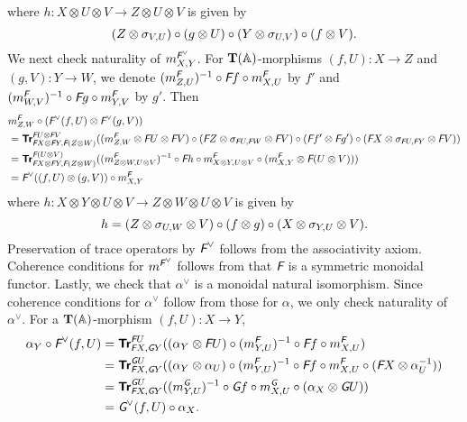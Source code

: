 where $h \colon X \otimes U \otimes V \to Z \otimes U \otimes V$ is given by
\begin{equation*}
  (Z \otimes \sigma_{V,U}) \circ (g \otimes U) \circ (Y \otimes \sigma_{U,V})
  \circ (f \otimes V).
\end{equation*}
We next check naturality of $m^{\textit{\textsf{F}}^{\vee}}_{X,Y}$. For
$\mathbf T(\mathbb{A})$-morphisms $(f,U) \colon X \to Z$ and $(g,V) \colon Y
\to W$, we denote $(m^{\textit{\textsf{F}}}_{Z,U})^{-1} \circ \textit{\textsf{F}}f \circ m^{\textit{\textsf{F}}}_{X,U}$ by
$f'$ and $(m_{W,V}^{\textit{\textsf{F}}})^{-1} \circ \textit{\textsf{F}}g \circ m^{\textit{\textsf{F}}}_{Y,V}$ by $g'$. Then
\begin{align*}
  & m^{\textit{\textsf{F}}}_{Z,W} \circ (\textit{\textsf{F}}^{\vee}(f,U) \otimes \textit{\textsf{F}}^{\vee}(g,V)) \\
  &= {\normalfont\textsf{\textbf{Tr}}}^{\textit{\textsf{F}}U \otimes \textit{\textsf{F}}V}_{\textit{\textsf{F}}X \otimes \textit{\textsf{F}}Y,\textit{\textsf{F}}(Z \otimes W)}
  ((m^{\textit{\textsf{F}}}_{Z,W} \otimes \textit{\textsf{F}}U \otimes \textit{\textsf{F}}V) \circ
  (\textit{\textsf{F}}Z \otimes \sigma_{\textit{\textsf{F}}U,\textit{\textsf{F}}W} \otimes \textit{\textsf{F}}V) \circ
  (\textit{\textsf{F}}f' \otimes \textit{\textsf{F}}g') \circ
  (\textit{\textsf{F}}X \otimes \sigma_{\textit{\textsf{F}}U,\textit{\textsf{F}}Y} \otimes \textit{\textsf{F}}V)) \\
  &= {\normalfont\textsf{\textbf{Tr}}}^{\textit{\textsf{F}}(U \otimes V)}_{\textit{\textsf{F}}X \otimes \textit{\textsf{F}}Y,\textit{\textsf{F}}(Z \otimes W)}
  ((m_{Z \otimes W, U \otimes V}^{\textit{\textsf{F}}})^{-1} \circ
  \textit{\textsf{F}}h \circ
  m_{X \otimes Y, U \otimes V}^{\textit{\textsf{F}}} \circ
  (m_{X,Y}^{\textit{\textsf{F}}} \otimes \textit{\textsf{F}}(U \otimes V))) \\
  &= \textit{\textsf{F}}^{\vee}((f,U) \otimes (g,V)) \circ m^{\textit{\textsf{F}}}_{X,Y}
\end{align*}
where $h \colon X \otimes Y \otimes U \otimes V \to Z \otimes W \otimes U \otimes V$
is given by
\begin{equation*}
  h = (Z \otimes \sigma_{U,W} \otimes V) \circ (f \otimes g) \circ
  (X \otimes \sigma_{Y,U} \otimes V).
\end{equation*}
Preservation of trace operators by $\textit{\textsf{F}}^{\vee}$ follows from
the associativity axiom. Coherence conditions for
$m^{\textit{\textsf{F}}^{\vee}}$ follows from that $\textit{\textsf{F}}$ is a symmetric
monoidal functor. Lastly, we check that $\alpha^{\vee}$ is a
monoidal natural isomorphism. Since coherence conditions for
$\alpha^{\vee}$ follow from those for $\alpha$, we only check
naturality of $\alpha^{\vee}$. For a $\mathbf T(\mathbb{A})$-morphism $(f,U)
\colon X \to Y$,
\begin{align*}
  \alpha_{Y} \circ \textit{\textsf{F}}^{\vee}(f,U)
  &= {\normalfont\textsf{\textbf{Tr}}}^{\textit{\textsf{F}}U}_{\textit{\textsf{F}}X,\textit{\textsf{G}}Y}
  ((\alpha_{Y} \otimes \textit{\textsf{F}}U) \circ
  (m^{\textit{\textsf{F}}}_{Y,U})^{-1} \circ \textit{\textsf{F}}f \circ m^{\textit{\textsf{F}}}_{X,U}) \\
  &= {\normalfont\textsf{\textbf{Tr}}}^{\textit{\textsf{G}}U}_{\textit{\textsf{F}}X,\textit{\textsf{G}}Y}((\alpha_{Y} \otimes \alpha_{U}) \circ
  (m^{\textit{\textsf{F}}}_{Y,U})^{-1} \circ \textit{\textsf{F}}f \circ m^{\textit{\textsf{F}}}_{X,U}
  \circ (\textit{\textsf{F}}X \otimes \alpha^{-1}_{U})) \\
  &= {\normalfont\textsf{\textbf{Tr}}}^{\textit{\textsf{G}}U}_{\textit{\textsf{F}}X,\textit{\textsf{G}}Y}((m^{\textit{\textsf{G}}}_{Y,U})^{-1} \circ
  \textit{\textsf{G}}f \circ m^{\textit{\textsf{G}}}_{X,U}
  \circ (\alpha_{X} \otimes \textit{\textsf{G}}U)) \\
  &= \textit{\textsf{G}}^{\vee} (f,U) \circ \alpha_{X}.
\end{align*}

